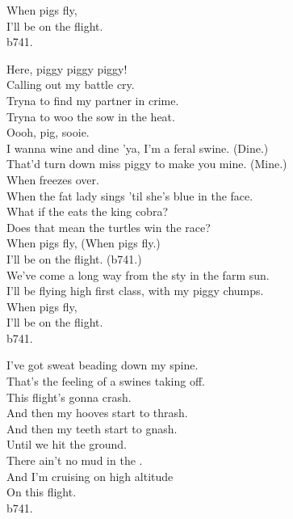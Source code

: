 When pigs fly, \\
I'll be on the flight. \\
b741. \\


Here, piggy piggy piggy! \\

Calling out my battle cry. \\
Tryna to find my partner in crime. \\
Tryna to woo the sow in the heat. \\
Oooh, pig, sooie. \\

I wanna wine and dine 'ya, I'm a feral swine. (Dine.) \\
That'd turn down miss piggy to make you mine. (Mine.) \\

When  freezes over. \\
When the fat lady sings 'til she's blue in the face. \\
What if the  eats the king cobra? \\
Does that mean the turtles win the race? \\

When pigs fly, (When pigs fly.) \\
I'll be on the flight. (b741.) \\

We've come a long way from the sty in the farm sun. \\
I'll be flying high first class, with my piggy chumps. \\

When pigs fly, \\
I'll be on the flight. \\
b741. \\


I've got sweat beading down my spine. \\
That's the feeling of a swines taking off. \\
This flight's gonna crash. \\
And then my hooves start to thrash. \\
And then my teeth start to gnash. \\
Until we hit the ground. \\

There ain't no mud in the . \\
And I'm cruising on high altitude \\
On this flight. \\
b741. \\

